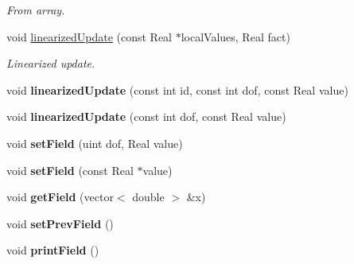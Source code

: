 \begin{DoxyCompactItemize}
\begin{DoxyCompactList}\small\item\em From array. \item\end{DoxyCompactList}\item 
\hypertarget{classvoom_1_1_phase_model_a7d541bf57d2b2378082d6dff8785e36f}{
void \hyperlink{classvoom_1_1_phase_model_a7d541bf57d2b2378082d6dff8785e36f}{linearizedUpdate} (const Real $\ast$localValues, Real fact)}
\label{classvoom_1_1_phase_model_a7d541bf57d2b2378082d6dff8785e36f}

\begin{DoxyCompactList}\small\item\em Linearized update. \item\end{DoxyCompactList}\item 
\hypertarget{classvoom_1_1_phase_model_afe218453dd05804000c49de4bed7a819}{
void {\bfseries linearizedUpdate} (const int id, const int dof, const Real value)}
\label{classvoom_1_1_phase_model_afe218453dd05804000c49de4bed7a819}

\item 
\hypertarget{classvoom_1_1_phase_model_a6a28a5dba0e17824301414fd7c5b9654}{
void {\bfseries linearizedUpdate} (const int dof, const Real value)}
\label{classvoom_1_1_phase_model_a6a28a5dba0e17824301414fd7c5b9654}

\item 
\hypertarget{classvoom_1_1_phase_model_a43d9a3197b8a1530d2efcf6251b9b95b}{
void {\bfseries setField} (uint dof, Real value)}
\label{classvoom_1_1_phase_model_a43d9a3197b8a1530d2efcf6251b9b95b}

\item 
\hypertarget{classvoom_1_1_phase_model_a008fee25be270c01c45bf74e996ece2e}{
void {\bfseries setField} (const Real $\ast$value)}
\label{classvoom_1_1_phase_model_a008fee25be270c01c45bf74e996ece2e}

\item 
\hypertarget{classvoom_1_1_phase_model_a359d422036f1a9dc7d665de9bedff793}{
void {\bfseries getField} (vector$<$ double $>$ \&x)}
\label{classvoom_1_1_phase_model_a359d422036f1a9dc7d665de9bedff793}

\item 
\hypertarget{classvoom_1_1_phase_model_aa44ebd1d4274f9df60d09b4e6375b924}{
void {\bfseries setPrevField} ()}
\label{classvoom_1_1_phase_model_aa44ebd1d4274f9df60d09b4e6375b924}

\item 
\hypertarget{classvoom_1_1_phase_model_a8e5700266e5ff7a5d0b53f98fe2fbecd}{
void {\bfseries printField} ()}
\label{classvoom_1_1_phase_model_a8e5700266e5ff7a5d0b53f98fe2fbecd}


\end{DoxyCompactItemize}
